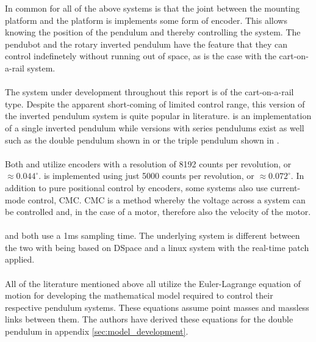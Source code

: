 In common for all of the above systems is that the joint between the mounting platform and the platform is implements some form of encoder.
This allows knowing the position of the pendulum and thereby controlling the system.
The pendubot and the rotary inverted pendulum have the feature that they can control indefinetely without running out of space, as is the case with the cart-on-a-rail system.
\\~\\
The system under development throughout this report is of the cart-on-a-rail type.
Despite the apparent short-coming of limited control range, this version of the inverted pendulum system is quite popular in literature.
\cite{invertpendulum3} is an implementation of a single inverted pendulum while versions with series pendulums exist as well such as the double pendulum shown in \cite{doubleinvertpendulum} or the triple pendulum shown in \cite{tripleinvertpendulum}.
\\~\\
Both \cite{doubleinvertpendulum} and \cite{tripleinvertpendulum} utilize encoders with a resolution of 8192 counts per revolution, or $\approx 0.044^\circ$.
\cite{invertpendulum3} is implemented using just 5000 counts per revolution, or $\approx 0.072^\circ$.
In addition to pure positional control by encoders, some systems \cite{invertpendulum1} also use current-mode control, CMC.
CMC is a method whereby the voltage across a system can be controlled and, in the case of a motor, therefore also the velocity of the motor.
\\~\\
\cite{doubleinvertpendulum} and \cite{tripleinvertpendulum} both use a 1ms sampling time.
The underlying system is different between the two with \cite{tripleinvertpendulum} being based on DSpace and \cite{doubleinvertpendulum} a linux system with the real-time patch applied.
\\~\\
All of the literature mentioned above all utilize the Euler-Lagrange equation of motion for developing the mathematical model required to control their respective pendulum systems. 
These equations assume point masses and massless links between them.
The authors have derived these equations for the double pendulum in appendix \ref{sec:model_development}.

